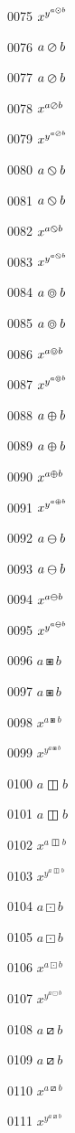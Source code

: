 \documentclass{article}
\begin{document}
0075 $x^{y^{a\varodot b}}$\par
0076 $a\varoslash b$\par
0077 $\displaystyle a\varoslash b$\par
0078 $x^{a\varoslash b}$\par
0079 $x^{y^{a\varoslash b}}$\par
0080 $a\varobslash b$\par
0081 $\displaystyle a\varobslash b$\par
0082 $x^{a\varobslash b}$\par
0083 $x^{y^{a\varobslash b}}$\par
0084 $a\varocircle b$\par
0085 $\displaystyle a\varocircle b$\par
0086 $x^{a\varocircle b}$\par
0087 $x^{y^{a\varocircle b}}$\par
0088 $a\varoplus b$\par
0089 $\displaystyle a\varoplus b$\par
0090 $x^{a\varoplus b}$\par
0091 $x^{y^{a\varoplus b}}$\par
0092 $a\varominus b$\par
0093 $\displaystyle a\varominus b$\par
0094 $x^{a\varominus b}$\par
0095 $x^{y^{a\varominus b}}$\par
0096 $a\boxast b$\par
0097 $\displaystyle a\boxast b$\par
0098 $x^{a\boxast b}$\par
0099 $x^{y^{a\boxast b}}$\par
0100 $a\boxbar b$\par
0101 $\displaystyle a\boxbar b$\par
0102 $x^{a\boxbar b}$\par
0103 $x^{y^{a\boxbar b}}$\par
0104 $a\boxdot b$\par
0105 $\displaystyle a\boxdot b$\par
0106 $x^{a\boxdot b}$\par
0107 $x^{y^{a\boxdot b}}$\par
0108 $a\boxslash b$\par
0109 $\displaystyle a\boxslash b$\par
0110 $x^{a\boxslash b}$\par
0111 $x^{y^{a\boxslash b}}$\par
\end{document}
